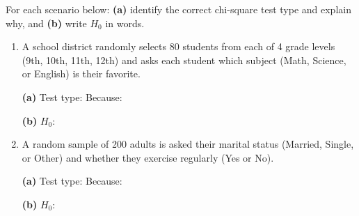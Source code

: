 \documentclass[10pt]{article}
\begin{document}
\namedateperiod

\vspace{0.1in}

For each scenario below: \textbf{(a)} identify the correct chi-square test type and explain
why, and \textbf{(b)} write $H_0$ in words.

\vspace{0.08in}

\begin{enumerate}

  \item A school district randomly selects 80 students from each of 4 grade levels
        (9th, 10th, 11th, 12th) and asks each student which subject (Math, Science, or English)
        is their favorite.

        \textbf{(a)} Test type: \blank{4.5cm} \quad Because: \writeline

        \textbf{(b)} $H_0$: 

  \item A random sample of 200 adults is asked their marital status
        (Married, Single, or Other) and whether they exercise regularly (Yes or No).

        \textbf{(a)} Test type: \blank{4.5cm} \quad Because: \writeline

        \textbf{(b)} $H_0$: 

\end{enumerate}
\end{document}
